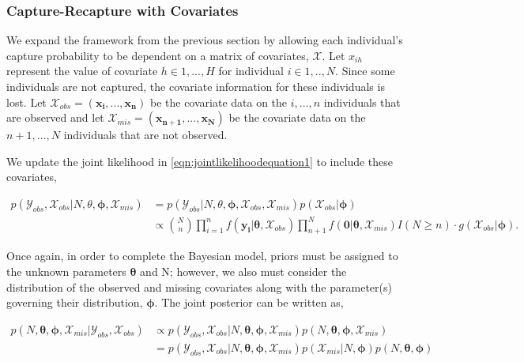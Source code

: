 \documentclass[
  12pt,
]{article}
\begin{document}
\subsubsection{Capture-Recapture with Covariates}
\label{sec:CRwithcovariates}

We expand the framework from the previous section by allowing each
individual's capture probability to be dependent on a matrix of
covariates, \(\mathcal{X}\). Let \(x_{ih}\) represent the value of
covariate \(h \in 1,...,H\) for individual \(i \in 1,..,N\). Since some
individuals are not captured, the covariate information for these
individuals is lost. Let
\(\mathcal{X}_{obs}=(\boldsymbol{x_i},...,\boldsymbol{x_n})\) be the
covariate data on the \(i,...,n\) individuals that are observed and let
\(\mathcal{X}_{mis}=(\boldsymbol{x_{n+1}},...,\boldsymbol{x_N})\) be the
covariate data on the \(n+1,...,N\) individuals that are not observed.

We update the joint likelihood in \autoref{eqn:jointlikelihoodequation1}
to include these covariates,

\begin{align}
\label{eqn:jointlikelihoodequation2}
\nonumber p(\mathcal{Y}_{obs},\mathcal{X}_{obs}|N,\theta,\boldsymbol{\phi},\mathcal{X}_{mis}) & = p(\mathcal{Y}_{obs}|N,\theta,\boldsymbol{\phi},\mathcal{X}_{obs},\mathcal{X}_{mis})p(\mathcal{X}_{obs}|\boldsymbol{\phi})\\
& \propto \binom{N}{n} \prod_{i=1}^n f(\boldsymbol{y_i}|\boldsymbol{\theta},\mathcal{X}_{obs})\prod_{n+1}^N f(\boldsymbol{0}|\boldsymbol{\theta},\mathcal{X}_{mis})I(N\ge n)\cdot g(\mathcal{X}_{obs}|\boldsymbol{\phi}).
\end{align}

Once again, in order to complete the Bayesian model, priors must be
assigned to the unknown parameters \(\boldsymbol{\theta}\) and N;
however, we also must consider the distribution of the observed and
missing covariates along with the parameter(s) governing their
distribution, \(\boldsymbol{\phi}\). The joint posterior can be written
as,

\begin{align}
\label{eqn:fullposteriorderive}
\nonumber p(N,\boldsymbol{\theta},\boldsymbol{\phi},\mathcal{X}_{mis}|\mathcal{Y}_{obs},\mathcal{X}_{obs}) & \propto p(\mathcal{Y}_{obs},\mathcal{X}_{obs}|N,\boldsymbol{\theta},\boldsymbol{\phi},\mathcal{X}_{mis})p(N,\boldsymbol{\theta},\boldsymbol{\phi},\mathcal{X}_{mis}) \\
& = p(\mathcal{Y}_{obs},\mathcal{X}_{obs}|N,\boldsymbol{\theta},\boldsymbol{\phi},\mathcal{X}_{mis})p(\mathcal{X}_{mis}|N,\boldsymbol{\phi})p(N,\boldsymbol{\theta},\boldsymbol{\phi})
\end{align}
\end{document}
